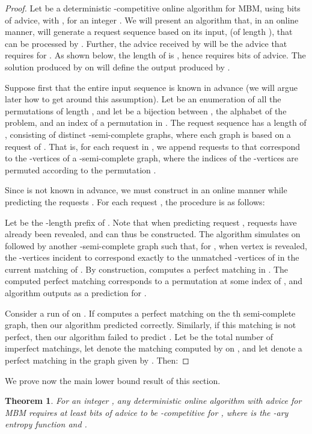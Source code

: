 \documentclass[a4paper]{article}
\newtheorem{theorem}{Theorem}
\begin{document}
\begin{proof}
  Let  be a deterministic -competitive online algorithm for \textsc{MBM},
  using  bits of advice, with , for an
  integer . We will present an algorithm  that, in an online manner,
  will generate a request sequence  based on its input,  (of length ), that can be processed
  by . Further, the advice received by  will be the advice that
   requires for . As shown below, the length of  is , hence
   requires  bits of advice. The solution produced by  on
   will define the output produced by .

  Suppose first that the entire input sequence  is known in advance (we will argue later how to get around
  this assumption). Let  be an enumeration of all the permutations of length ,
and let  be a bijection between , the alphabet of the  problem,
and an index of a permutation in . The request sequence  has a length of ,
consisting of  distinct -semi-complete graphs, where each graph is based on a request of .
That is, for each request  in , we append  requests to  that correspond to
the -vertices of a -semi-complete graph, where the indices of the -vertices
are permuted according to the permutation .


Since  is not known in advance,
we must construct  in an online manner while predicting the requests . For each
request , the procedure is as follows:

Let  be the -length prefix of . Note that when predicting
request , requests  have already been revealed, and
 can thus be constructed.
The algorithm  simulates  on  followed by
another -semi-complete graph  such that, for ,
when vertex  is revealed, the -vertices incident to  correspond exactly
to the unmatched -vertices of  in the current matching of . By construction,
 computes a perfect matching in .
The computed perfect matching corresponds to a permutation  at some index  of , and algorithm
 outputs  as a prediction for .

Consider a run of  on . If  computes
a perfect matching on the th semi-complete graph, then our algorithm predicted  correctly.
Similarly, if this matching is not perfect, then
our algorithm failed to predict . Let  be the total number of imperfect matchings,
let  denote the matching computed by  on , and let
 denote a perfect matching in the graph given by . Then:

\end{proof}

We prove now the main lower bound result of this section.
\begin{theorem}\label{thm:lbEps}
  For an integer , any deterministic online algorithm with advice for \textsc{MBM}
  requires at least  bits of advice to be
  -competitive for , where  is the -ary
  entropy function and .
\end{theorem}
\end{document}
